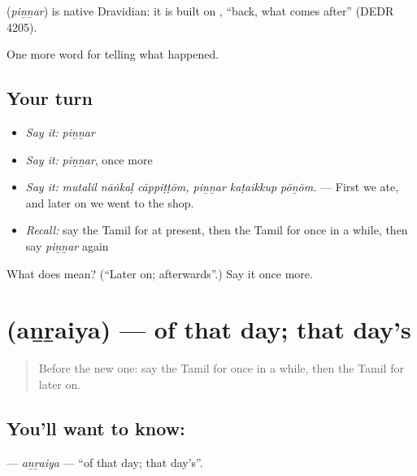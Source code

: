 \begin{cousinweb}
\textbf{} (\emph{piṉṉar}) is native Dravidian: it is built on , \textquotedblleft{}back, what comes after\textquotedblright{} (DEDR 4205).
\end{cousinweb}

\begin{grammarlens}[title={What you've built}]
One more word for telling what happened.
\end{grammarlens}

\subsection*{Your turn}
\begin{itemize}
\raggedright
  \item \emph{Say it:} \emph{piṉṉar}
  \item \emph{Say it:} \emph{piṉṉar}, once more
  \item \emph{Say it:} \emph{mutalil nāṅkaḷ cāppiṭṭōm, piṉṉar kaṭaikkup pōṉōm.} — First we ate, and later on we went to the shop.
  \item \emph{Recall:} say the Tamil for at present, then the Tamil for once in a while, then say \emph{piṉṉar} again
\end{itemize}

\begin{tcolorbox}[breakable,colback=teal!4,colframe=teal!35!black,title={Before you move on}]
What does  mean? (\textquotedblleft{}Later on; afterwards\textquotedblright{}.) Say it once more.
\end{tcolorbox}
\section[\texorpdfstring{\ta{அன்றைய} (aṉṟaiya)}{அன்றைய (aṉṟaiya)}]{ (aṉṟaiya) — of that day; that day's}

\label{lesson:TA-C316-anraiya}



\begin{quote}
Before the new one: say the Tamil for once in a while, then the Tamil for later on.
\end{quote}

\subsection*{You'll want to know: }
\textbf{} — \emph{aṉṟaiya} — \textquotedblleft{}of that day; that day's\textquotedblright{}.

